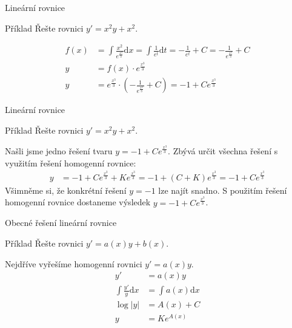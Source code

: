 \documentclass{beamer}
\theoremstyle{definition}
\theoremstyle{example}
\def\d{\mathrm{d}}
\begin{document}
\begin{frame}{Lineární rovnice}
	\begin{exampleblock}{Příklad}
		Řešte rovnici $y' = x^2y + x^2$.
	\end{exampleblock}
	\begin{align*}
		f(x) &=\int \frac{x^2}{e^\frac{x^3}{3}} \d x = \int \frac{1}{e^t} \d t = - \frac{1}{e^t} + C = -\frac{1}{e^{\frac{x^3}{3}}} + C\\
		y &= f(x)\cdot e^\frac{x^3}{3}\\
		y &=  e^\frac{x^3}{3} \cdot \left(-\frac{1}{e^{\frac{x^3}{3}}} + C\right) = -1 + Ce^{\frac{x^3}{3}}
	\end{align*}
\end{frame}

\begin{frame}{Lineární rovnice}
	\begin{exampleblock}{Příklad}
		Řešte rovnici $y' = x^2y + x^2$.
	\end{exampleblock}
	Našli jsme jedno řešení tvaru $y = -1 + Ce^{\frac{x^3}{3}}$. Zbývá určit všechna řešení s využitím řešení homogenní rovnice:
	\begin{align*}
		y &= -1 + Ce^{\frac{x^3}{3}} + Ke^{\frac{x^3}{3}} =  -1 + (C + K)e^{\frac{x^3}{3}} = -1 + Ce^{\frac{x^3}{3}}
	\end{align*}
	Všimněme si, že konkrétní řešení $y = -1$ lze najít snadno. S použitím řešení homogenní rovnice dostaneme výsledek $y = -1 + Ce^{\frac{x^3}{3}}$.
\end{frame}

\begin{frame}{Obecné řešení lineární rovnice}
	\begin{exampleblock}{Příklad}
		Řešte rovnici $y' = a(x)y + b(x)$.
	\end{exampleblock}
	Nejdříve vyřešíme homogenní rovnici $y' = a(x)y$.
	\begin{align*}
		y' &= a(x)y\\
		\int\frac{y'}{y} \d x &= \int a(x) \d x\\
		\log |y| &= A(x) + C\\
		y &= K e^{A(x)}
	\end{align*}
\end{frame}
\end{document}
